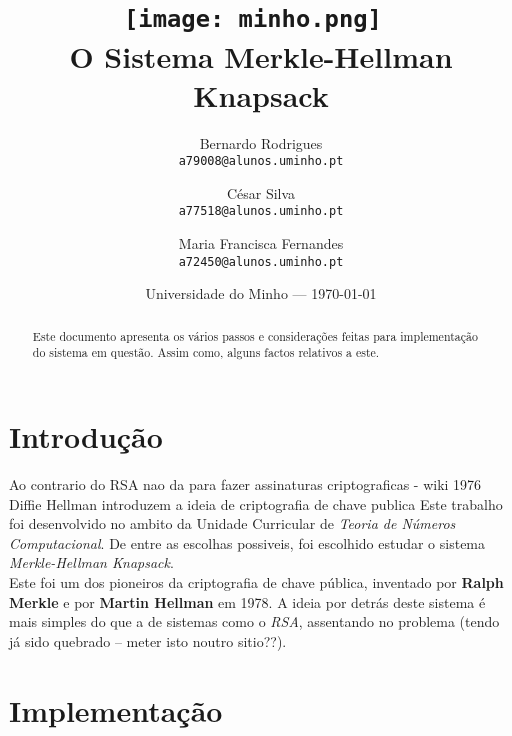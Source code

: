 \documentclass[11pt, language=portuguese]{report}
\begin{document}
\title{\texttt{[image: minho.png]}~\\[1cm] O Sistema Merkle-Hellman Knapsack}

\author{Bernardo Rodrigues\\ \texttt{a79008@alunos.uminho.pt}\\ \and César Silva\\ \texttt{a77518@alunos.uminho.pt}\\ \and Maria Francisca Fernandes\\ \texttt{a72450@alunos.uminho.pt}\\}

\date{Universidade do Minho --- \today}

\maketitle

\begin{abstract}

	Este documento apresenta os vários passos e considerações feitas para implementação do sistema em questão. Assim como, alguns factos relativos a este.  


\end{abstract}

\tableofcontents

\listofalgorithms

\chapter{Introdução}

	Ao contrario do RSA nao da para fazer assinaturas criptograficas - wiki
1976 Diffie Hellman introduzem a ideia de criptografia de chave publica
Este trabalho foi desenvolvido no ambito da Unidade Curricular de \textit{Teoria de Números Computacional}. De entre as escolhas possiveis, foi escolhido estudar o sistema \textit{Merkle-Hellman Knapsack}. \\
Este foi um dos pioneiros da criptografia de chave pública, inventado por \textbf{Ralph Merkle} e por \textbf{Martin Hellman} em 1978.
A ideia por detrás deste sistema é mais simples do que a de sistemas como o \textit{RSA}, assentando no problema  (tendo já sido quebrado -- meter isto noutro sitio??).

\chapter{Implementação}
\end{document}
